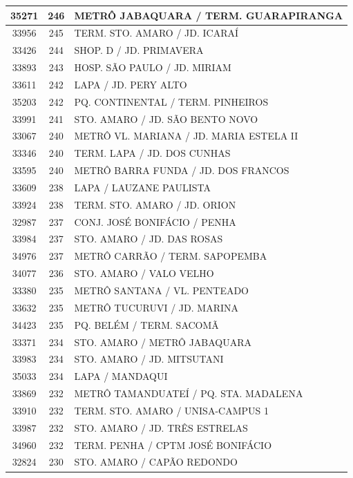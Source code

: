 \documentclass[
	12pt,				%
	oneside,			%
	a4paper,			%
	english,			%
	brazil				%
	]{abntex2ppgsi}
\begin{document}
{{\begin{apendicesenv}
\begin{longtable}{c|c|p{7cm}}
 \hline 
35271 &	246 &	METRÔ JABAQUARA / TERM. GUARAPIRANGA \\ 
 \hline 
33956 &	245 &	TERM. STO. AMARO / JD. ICARAÍ \\ 
 \hline 
33426 &	244 &	SHOP. D / JD. PRIMAVERA \\ 
 \hline 
33893 &	243 &	HOSP. SÃO PAULO / JD. MIRIAM \\ 
 \hline 
33611 &	242 &	LAPA / JD. PERY ALTO \\ 
 \hline 
35203 &	242 &	PQ. CONTINENTAL / TERM. PINHEIROS \\ 
 \hline 
33991 &	241 &	STO. AMARO / JD. SÃO BENTO NOVO \\ 
 \hline 
33067 &	240 &	METRÔ VL. MARIANA / JD. MARIA ESTELA II \\ 
 \hline 
33346 &	240 &	TERM. LAPA / JD. DOS CUNHAS \\ 
 \hline 
33595 &	240 &	METRÔ BARRA FUNDA / JD. DOS FRANCOS \\ 
 \hline 
33609 &	238 &	LAPA / LAUZANE PAULISTA \\ 
 \hline 
33924 &	238 &	TERM. STO. AMARO / JD. ORION \\ 
 \hline 
32987 &	237 &	CONJ. JOSÉ BONIFÁCIO / PENHA \\ 
 \hline 
33984 &	237 &	STO. AMARO / JD. DAS ROSAS \\ 
 \hline 
34976 &	237 &	METRÔ CARRÃO / TERM. SAPOPEMBA \\ 
 \hline 
34077 &	236 &	STO. AMARO / VALO VELHO \\ 
 \hline 
33380 &	235 &	METRÔ SANTANA / VL. PENTEADO \\ 
 \hline 
33632 &	235 &	METRÔ TUCURUVI / JD. MARINA \\ 
 \hline 
34423 &	235 &	PQ. BELÉM / TERM. SACOMÃ \\ 
 \hline 
33371 &	234 &	STO. AMARO / METRÔ JABAQUARA \\ 
 \hline 
33983 &	234 &	STO. AMARO / JD. MITSUTANI \\ 
 \hline 
35033 &	234 &	LAPA / MANDAQUI \\ 
 \hline 
33869 &	232 &	METRÔ TAMANDUATEÍ / PQ. STA. MADALENA \\ 
 \hline 
33910 &	232 &	TERM. STO. AMARO / UNISA-CAMPUS 1 \\ 
 \hline 
33987 &	232 &	STO. AMARO / JD. TRÊS ESTRELAS \\ 
 \hline 
34960 &	232 &	TERM. PENHA / CPTM JOSÉ BONIFÁCIO \\ 
 \hline 
32824 &	230 &	STO. AMARO / CAPÃO REDONDO \\ 

\end{longtable}
\end{apendicesenv}}}
\end{document}
